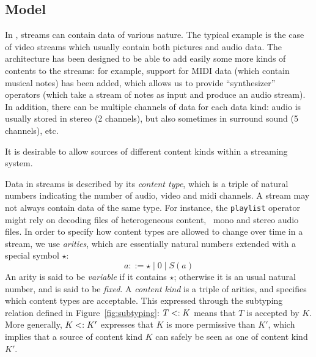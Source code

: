 
\subsection{Model}


In \liquidsoap{}, streams can contain data of various nature. The typical
example is the case of video streams which usually contain both pictures and
audio data. The architecture has been designed to be able to add easily some
more kinds of contents to the streams: for example, support for MIDI data (which
contain musical notes) has been added, which allows us to provide
``synthesizer'' operators (which take a stream of notes as input and produce an
audio stream). In addition, there can be multiple channels of data for each data
kind: audio is usually stored in stereo (2 channels), but also sometimes in
surround sound (5 channels), etc.

It is desirable to allow sources of different content kinds within a 
streaming system.

Data in streams is described by its \emph{content type}, which is a triple
of natural numbers indicating the number of audio, video and midi channels.
A stream may not always contain data of the same type.
For instance, the \texttt{playlist} operator might rely on decoding files
of heterogeneous content, \eg\ mono and stereo audio files.
In order to specify how content types are allowed to change over time
in a stream, we use \emph{arities}, which are essentially natural numbers
extended with a special symbol $\star$:
\[ a ::= \star \;|\; 0 \;|\; S(a) \]
An arity is said to be \emph{variable} if it contains $\star$;
otherwise it is an usual natural number, and is said to be \emph{fixed}.
A \emph{content kind} is a triple of arities,
and specifies which content types are acceptable.
This expressed through the subtyping relation defined in 
Figure~\ref{fig:subtyping}: $T<: K$ means
that $T$ is accepted by $K$. More generally,
$K <: K'$ expresses that $K$ is more permissive than $K'$,
which implies that a source of content kind $K$ can safely be seen
as one of content kind $K'$.

